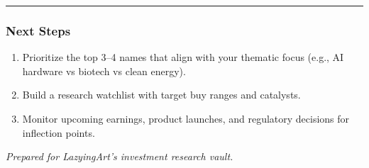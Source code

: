 \documentclass[
]{article}
\providecommand{\tightlist}{%
  \setlength{\itemsep}{0pt}\setlength{\parskip}{0pt}}
\begin{document}
\begin{center}\rule{0.5\linewidth}{0.5pt}\end{center}

\hypertarget{next-steps}{%
\subsubsection{Next Steps}\label{next-steps}}

\begin{enumerate}
\def\labelenumi{\arabic{enumi}.}
\tightlist
\item
  Prioritize the top 3--4 names that align with your thematic focus
  (e.g., AI hardware vs biotech vs clean energy).\\
\item
  Build a research watchlist with target buy ranges and catalysts.\\
\item
  Monitor upcoming earnings, product launches, and regulatory decisions
  for inflection points.
\end{enumerate}

\emph{Prepared for LazyingArt's investment research vault.}
\end{document}
